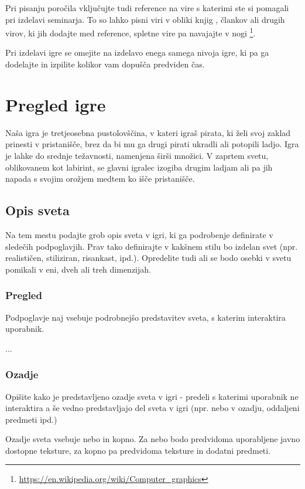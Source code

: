 \documentclass[a4paper]{article}
\begin{document}
Pri pisanju poročila vključujte tudi reference na vire s katerimi ste si pomagali pri izdelavi seminarja. To so lahko pisni viri v obliki knjig \cite{dirksen2013learning}, člankov \cite{wiki:Overboard!} ali drugih virov, ki jih dodajte med reference, spletne vire pa navajajte v nogi \footnote{\url{https://en.wikipedia.org/wiki/Computer_graphics}}.

Pri izdelavi igre se omejite na izdelavo enega samega nivoja igre, ki pa ga dodelajte in izpilite kolikor vam do\-pu\-šča predviden čas.




\section{Pregled igre}
Naša igra je tretjeosebna pustolovščina, v kateri igraš pirata, ki želi svoj zaklad prinesti v pristanišče, brez da bi mu ga drugi pirati ukradli ali potopili ladjo. Igra je lahke do srednje težavnosti, namenjena širši množici. V zaprtem svetu, oblikovanem kot labirint, se glavni igralec izogiba drugim ladjam ali pa jih napada s svojim orožjem medtem ko išče pristanišče.

\subsection{Opis sveta}
Na tem mestu podajte grob opis sveta v igri, ki ga podrobenje definirate v sledečih podpoglavjih. Prav tako definirajte v kakšnem stilu bo izdelan svet (npr. realističen, stiliziran, risankast, ipd.). Opredelite tudi ali se bodo osebki v svetu pomikali v eni, dveh ali treh dimenzijah.

\subsubsection{Pregled}
Podpoglavje naj vsebuje podrobnejšo predstavitev sveta, s katerim interaktira uporabnik.

...

\subsubsection{Ozadje}
Opišite kako je predstavljeno ozadje sveta v igri - predeli s katerimi uporabnik ne interaktira a še vedno predstavljajo del sveta v igri (npr. nebo v ozadju, oddaljeni predmeti ipd.)

Ozadje sveta vsebuje nebo in kopno. Za nebo bodo predvidoma uporabljene javno dostopne teksture, za kopno pa predvidoma teksture in dodatni predmeti.
\end{document}
